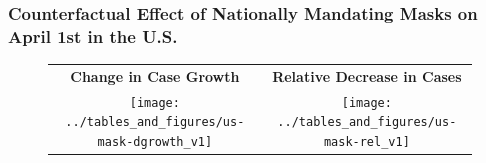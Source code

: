 \documentclass{beamer}
\begin{document}
\begin{frame}
  \frametitle{Counterfactual Effect of Nationally Mandating Masks on April 1st in the U.S. }


\begin{figure}[ht]
  \begin{minipage}{\linewidth}
    \centering 
    \begin{tabular}{cc}
      \textbf{Change in Case Growth} &  \textbf{Relative Decrease in Cases}\\
      \texttt{[image: ../tables\_and\_figures/us-mask-dgrowth\_v1]}
      &
        \texttt{[image: ../tables\_and\_figures/us-mask-rel\_v1]}
    \end{tabular}
  \end{minipage}
\end{figure}



\end{frame}


\end{document}
